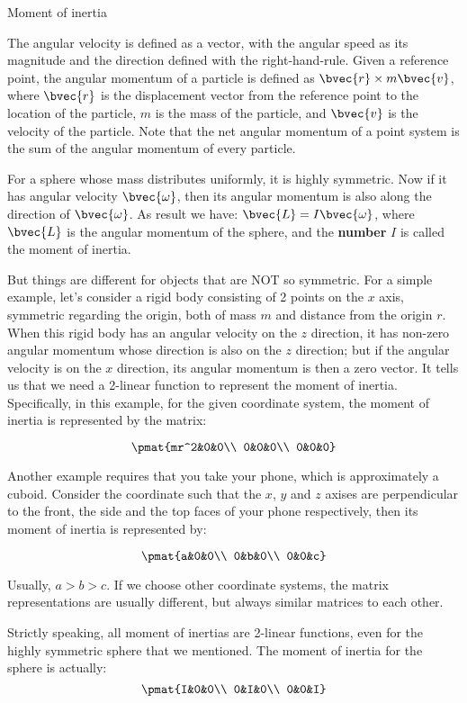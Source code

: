 \begin{example}{Moment of inertia}


The angular velocity is defined as a vector, with the angular speed as its magnitude and the direction defined with the right-hand-rule. Given a reference point, the angular momentum of a particle is defined as $\bvec{r}\times m\bvec{v}$, where $\bvec{r}$ is the displacement vector from the reference point to the location of the particle, $m$ is the mass of the particle, and $\bvec{v}$ is the velocity of the particle. Note that the net angular momentum of a point system is the sum of the angular momentum of every particle. 

For a sphere whose mass distributes uniformly, it is highly symmetric. Now if it has angular velocity $\bvec{\omega}$, then its angular momentum is also along the direction of $\bvec{\omega}$. As result we have: $\bvec{L}=I\bvec{\omega}$, where $\bvec{L}$ is the angular momentum of the sphere, and the \textbf{number} $I$ is called the moment of inertia. 

But things are different for objects that are NOT so symmetric. For a simple example, let's consider a rigid body consisting of 2 points on the $x$ axis, symmetric regarding the origin, both of mass $m$ and distance from the origin $r$. When this rigid body has an angular velocity on the $z$ direction, it has non-zero angular momentum whose direction is also on the $z$ direction; but if the angular velocity is on the $x$ direction, its angular momentum is then a zero vector. It tells us that we need a 2-linear function to represent the moment of inertia. Specifically, in this example, for the given coordinate system, the moment of inertia is represented by the matrix: 

\begin{equation}
\pmat{mr^2&0&0\\ 0&0&0\\ 0&0&0}
\end{equation}

Another example requires that you take your phone, which is approximately a cuboid. Consider the coordinate such that the $x$, $y$ and $z$ axises are perpendicular to the front, the side and the top faces of your phone respectively, then its moment of inertia is represented by: 

\begin{equation}
\pmat{a&0&0\\ 0&b&0\\ 0&0&c}
\end{equation}

Usually, $a>b>c$. If we choose other coordinate systems, the matrix representations are usually different, but always similar matrices to each other. 

Strictly speaking, all moment of inertias are 2-linear functions, even for the highly symmetric sphere that we mentioned. The moment of inertia for the sphere is actually: 
\begin{equation}
\pmat{I&0&0\\ 0&I&0\\ 0&0&I}
\end{equation}
\end{example}

